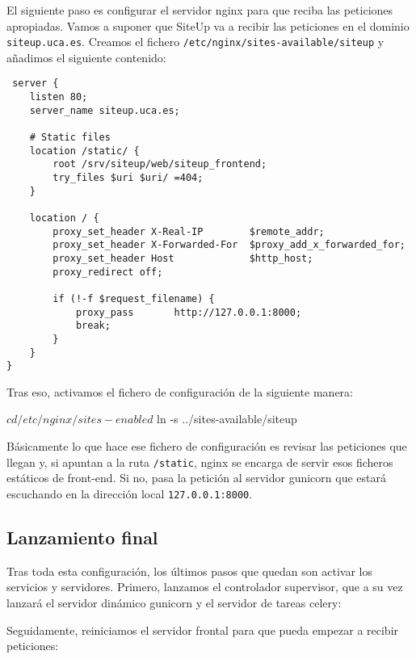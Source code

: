El siguiente paso es configurar el servidor nginx para que reciba las peticiones
apropiadas. Vamos a suponer que SiteUp va a recibir las peticiones en el dominio
\texttt{siteup.uca.es}. Creamos el fichero
\texttt{/etc/nginx/sites-available/siteup} y añadimos el siguiente contenido:

\begin{verbatim}
 server {
    listen 80;
    server_name siteup.uca.es;

    # Static files
    location /static/ {
        root /srv/siteup/web/siteup_frontend;
        try_files $uri $uri/ =404;
    }

    location / {
        proxy_set_header X-Real-IP        $remote_addr;
        proxy_set_header X-Forwarded-For  $proxy_add_x_forwarded_for;
        proxy_set_header Host             $http_host;
        proxy_redirect off;

        if (!-f $request_filename) {
            proxy_pass       http://127.0.0.1:8000;
            break;
        }
    }
} 
\end{verbatim}

Tras eso, activamos el fichero de configuración de la siguiente manera:

\begin{bashcode}
$ cd /etc/nginx/sites-enabled
$ ln -s ../sites-available/siteup
\end{bashcode}

Básicamente lo que hace ese fichero de configuración es revisar las peticiones
que llegan y, si apuntan a la ruta \texttt{/static}, nginx se encarga de servir
esos ficheros estáticos de front-end. Si no, pasa la petición al servidor
gunicorn que estará escuchando en la dirección local \texttt{127.0.0.1:8000}.

\subsection{Lanzamiento final}

Tras toda esta configuración, los últimos pasos que quedan son activar los
servicios y servidores. Primero, lanzamos el controlador supervisor, que a su
vez lanzará el servidor dinámico gunicorn y el servidor de tareas celery:


Seguidamente, reiniciamos el servidor frontal para que pueda empezar a recibir
peticiones:

